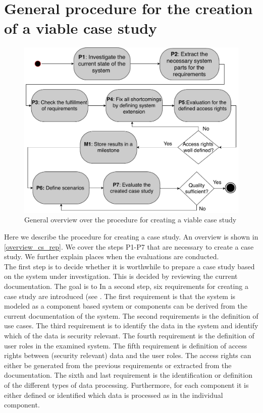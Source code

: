 \section{General procedure for the creation of a viable case study}
\label{cs_overview}
\begin{figure}
\includegraphics[scale=.7]{logos/Procedure.pdf} 
\caption{General overview over the procedure for creating a viable case study}
\label{overview_cs_rep}
\end{figure}
Here we describe the procedure for creating a case study. An overview is shown in \autoref{overview_cs_rep}. We cover the steps P1-P7 that are necessary to create a case study. We further explain places when the evaluations are conducted.  \\
The first step is to decide whether it is worthwhile to prepare a case study based on the system under investigation. This is decided by reviewing the current documentation. The goal is to   
In a second step, six requirements for creating a case study are introduced (see . The first requirement is that the system is modeled as a component based system or components can be derived from the current documentation of the system. The second requirements is the definition of use cases. The third requirement is to identify the data in the system and identify which of the data is security relevant. The fourth requirement is the definition of user roles in the examined system. The fifth requirement is definition of access rights between (security relevant) data and the user roles. The access rights can either be generated from the previous requirements or extracted from the documentation. The sixth and last requirement is the identification or definition of the different types of data processing. Furthermore, for each component it is either defined or identified which data is processed as in the individual component.\\

